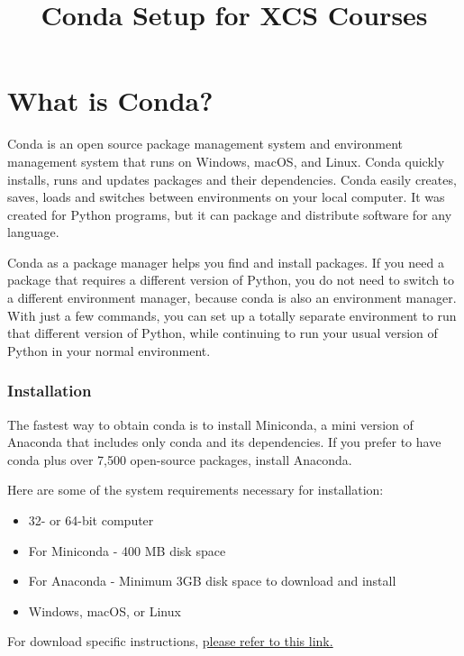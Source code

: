 \documentclass{article}
\begin{document}
\title{Conda Setup for XCS Courses}
\date{}
\maketitle


\part*{What is Conda?}

Conda is an open source package management system and environment management system that runs on Windows, macOS, and Linux. Conda quickly installs, runs and updates packages and their dependencies. Conda easily creates, saves, loads and switches between environments on your local computer. It was created for Python programs, but it can package and distribute software for any language. 

Conda as a package manager helps you find and install packages. If you need a package that requires a different version of Python, you do not need to switch to a different environment manager, because conda is also an environment manager. With just a few commands, you can set up a totally separate environment to run that different version of Python, while continuing to run your usual version of Python in your normal environment.

\section{Installation}

The fastest way to obtain conda is to install Miniconda, a mini version of Anaconda that includes only conda and its dependencies. If you prefer to have conda plus over 7,500 open-source packages, install Anaconda.

Here are some of the system requirements necessary for installation:
\begin{itemize}
  \item 32- or 64-bit computer
  \item For Miniconda - 400 MB disk space
  \item For Anaconda - Minimum 3GB disk space to download and install
  \item Windows, macOS, or Linux
\end{itemize}

For download specific instructions, \href{https://docs.conda.io/projects/conda/en/latest/user-guide/install/index.html}{please refer to this link.}
\end{document}
